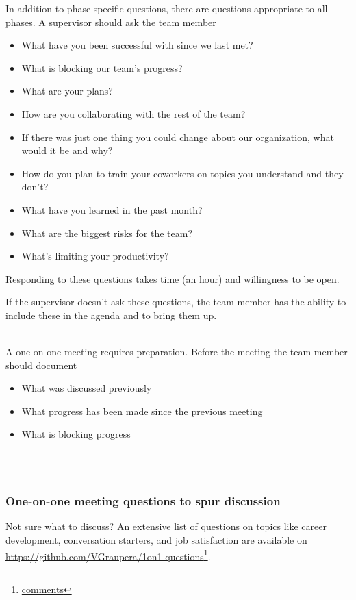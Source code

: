 

In addition to phase-specific questions, there are questions appropriate to all phases. A supervisor should ask the team member
\begin{itemize}
    \item What have you been successful with since we last met?
    \item What is blocking our team's progress?
    \item What are your plans?
    \item How are you collaborating with the rest of the team?
    \item If there was just one thing you could change about our organization, what would it be and why?
    \item How do you plan to train your coworkers on topics you understand and they don't?
    \item What have you learned in the past month?
    \item What are the biggest risks for the team?
    \item What's limiting your productivity?
\end{itemize}
Responding to these questions takes time (an hour) and willingness to be open. 

If the supervisor doesn't ask these questions, the team member has the ability to include these in the agenda and to bring them up. 


\ \\

A one-on-one meeting requires preparation. Before the meeting the team member should document
\begin{itemize}
    \item What was discussed previously
    \item What progress has been made since the previous meeting
    \item What is blocking progress
\end{itemize}


\ \\


\ \\

\subsubsection{One-on-one meeting questions to spur discussion}

Not sure what to discuss? An extensive list of questions on topics like career development, conversation starters, and job satisfaction are available on \href{https://github.com/VGraupera/1on1-questions}{https://github.com/VGraupera/1on1-questions}\footnote{\href{https://news.ycombinator.com/item?id=22341138}{comments}}.